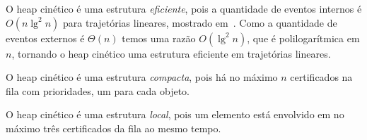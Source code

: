 O heap cinético é uma estrutura \textit{eficiente}, pois a quantidade de eventos
internos é $O(n\lg^2{n})$ para trajetórias lineares, mostrado em~\cite{basch-thesis}.
Como a quantidade de eventos externos é $\Theta(n)$ temos uma razão $O(\lg^2{n})$, que é
polilogarítmica em $n$, tornando o heap cinético uma estrutura eficiente em trajetórias lineares.

O heap cinético é uma estrutura \textit{compacta}, pois há no máximo $n$
certificados na fila com prioridades, um para cada objeto.

O heap cinético é uma estrutura \textit{local}, pois um elemento está envolvido
em no máximo três certificados da fila ao mesmo tempo.


